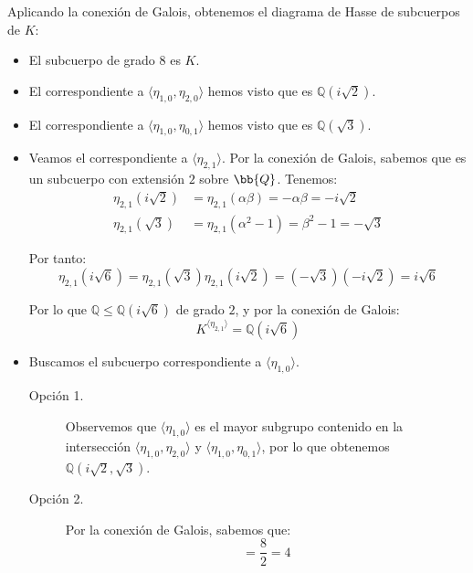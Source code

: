 \begin{ejemplo}
    Aplicando la conexión de Galois, obtenemos el diagrama de Hasse de subcuerpos de $K$:
    \begin{itemize}
        \item El subcuerpo de grado $8$ es $K$.
        \item El correspondiente a $\langle \eta_{1,0}, \eta_{2,0}\rangle$ hemos visto que es $\mathbb{Q}\left(i\sqrt{2}\right)$.
        \item El correspondiente a $\langle \eta_{1,0}, \eta_{0,1}\rangle$ hemos visto que es $\mathbb{Q}(\sqrt{3})$.
        \item Veamos el correspondiente a $\langle \eta_{2,1}\rangle$. Por la conexión de Galois, sabemos que es un subcuerpo con extensión $2$ sobre $\bb{Q}$. Tenemos:
        \begin{align*}
            \eta_{2,1}(i\sqrt{2}) &= \eta_{2,1}(\alpha\beta) = -\alpha\beta = -i\sqrt{2}\\
            \eta_{2,1}(\sqrt{3}) &= \eta_{2,1}(\alpha^2-1) = \beta^2-1 = -\sqrt{3}
        \end{align*}

        Por tanto:
        \begin{equation*}
            \eta_{2,1}(i\sqrt{6}) = \eta_{2,1}(\sqrt{3})\eta_{2,1}(i\sqrt{2}) = (-\sqrt{3})(-i\sqrt{2}) = i\sqrt{6}
        \end{equation*}

        Por lo que $\mathbb{Q}\leq \mathbb{Q}(i\sqrt{6})$ de grado $2$, y por la conexión de Galois:
        \begin{equation*}
            K^{\langle \eta_{2,1}\rangle} = \mathbb{Q}(i\sqrt{6})
        \end{equation*}

        \item Buscamos el subcuerpo correspondiente a $\langle \eta_{1,0}\rangle$.
        \begin{description}
            \item[Opción 1.] Observemos que $\langle \eta_{1,0} \rangle $ es el mayor subgrupo contenido en la intersección $\langle \eta_{1,0},\eta_{2,0} \rangle $ y $\langle \eta_{1,0},\eta_{0,1} \rangle $, por lo que obtenemos $\mathbb{Q}(i\sqrt{2},\sqrt{3})$.
            \item[Opción 2.] Por la conexión de Galois, sabemos que:
            \begin{equation*}
                [K^{\langle \eta_{1,0} \rangle }:\mathbb{Q}] = \dfrac{8}{2} = 4
            \end{equation*}


\end{description}
\end{itemize}
\end{ejemplo}
